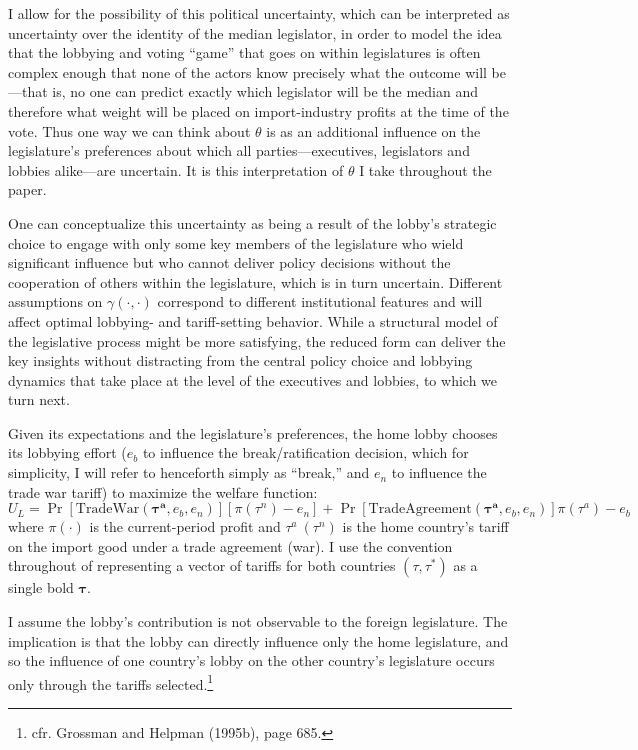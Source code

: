 \documentclass[10pt]{article}
\newcommand{\ta}{\theta}
\newcommand{\bta}{\bm{\tau^a}}
\newcommand{\ga}{\gamma}
\begin{document}
I allow for the possibility of this political uncertainty, which can be interpreted as uncertainty over the identity of the median legislator, in order to model the idea that the lobbying and voting ``game'' that goes on within legislatures is often complex enough that none of the actors know precisely what the outcome will be---that is, no one can predict exactly which legislator will be the median and therefore what weight will be placed on import-industry profits at the time of the vote. Thus one way we can think about $\ta$ is as an additional influence on the legislature's preferences about which all parties---executives, legislators and lobbies alike---are uncertain. It is this interpretation of $\ta$ I take throughout the paper.

One can conceptualize this uncertainty as being a result of the lobby's strategic choice to engage with only some key members of the legislature who wield significant influence but who cannot deliver policy decisions without the cooperation of others within the legislature, which is in turn uncertain. Different assumptions on $\ga(\cdot,\cdot)$ correspond to different institutional features and will affect optimal lobbying- and tariff-setting behavior. While a structural model of the legislative process might be more satisfying, the reduced form can deliver the key insights without distracting from the central policy choice and lobbying dynamics that take place at the level of the executives and lobbies, to which we turn next. 

Given its expectations and the legislature's preferences, the home lobby chooses its lobbying effort ($e_b$ to influence the break/ratification decision, which for simplicity, I will refer to henceforth simply as ``break,'' and $e_n$ to influence the trade war tariff) to maximize the welfare function:
\begin{equation}
  U_L = \Pr\left[ \text{TradeWar}(\bta,e_b,e_n) \right] \left[ \pi(\tau^{\mathit{n}}) - e_n \right] + \Pr\left[ \text{TradeAgreement}(\bta,e_b,e_n) \right] \pi(\tau^a) - e_b
  \label{eq:lv}
\end{equation}
where $\pi(\cdot)$ is the current-period profit and $\tau^a \ (\tau^\mathit{n})$ is the home country's tariff on the import good under a trade agreement (war). I use the convention throughout of representing a vector of tariffs for both countries $(\tau,\tau^*)$ as a single bold $\bm{\tau}$. 

I assume the lobby's contribution is not observable to the foreign legislature. The implication is that the lobby can directly influence only the home legislature, and so the influence of one country's lobby on the other country's legislature occurs only through the tariffs selected.\footnote{cfr. Grossman and Helpman (1995b), page 685.}
\end{document}
